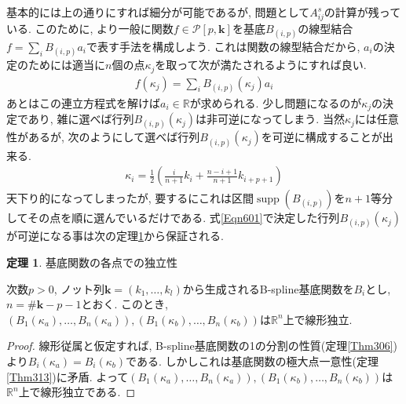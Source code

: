 \documentclass{jsarticle}
\newcommand\setR{\mathbb{R}}
\newcommand\Pare[1]{\left(#1\right)}
\DeclareMathOperator{\supp}{supp}
\theoremstyle{definition}%
\newtheorem{thm}{定理}
\begin{document}
基本的には上の通りにすれば細分が可能であるが, 問題として$A^s_{ij}$の計算が残っている.
このために, より一般に関数$f\in \mathcal{P}[p,\bm{k}]$を基底$B_{(i,p)}$の線型結合$f=\sum_iB_{(i,p)}a_i$で表す手法を構成しよう.
これは関数の線型結合だから, $a_i$の決定のためには適当に$n$個の点$\kappa_j$を取って次が満たされるようにすれば良い.
\begin{align}
    f(\kappa_j)=\sum_{i}B_{(i,p)}(\kappa_j)a_i
\end{align}
あとはこの連立方程式を解けば$a_i\in\setR$が求められる.
少し問題になるのが$\kappa_j$の決定であり, 雑に選べば行列$B_{(i,p)}(\kappa_j)$は非可逆になってしまう.
当然$\kappa_j$には任意性があるが, 次のようにして選べば行列$B_{(i,p)}(\kappa_j)$を可逆に構成することが出来る.
\begin{align}
    \label{Eqn601}
    \kappa_i=\frac{1}{2}\Pare{\frac{i}{n+1}k_i+\frac{n-i+1}{n+1}k_{i+p+1}}
\end{align}
天下り的になってしまったが, 要するにこれは区間$\supp(B_{(i,p)})$を$n+1$等分してその点を順に選んでいるだけである.
式\eqref{Eqn601}で決定した行列$B_{(i,p)}(\kappa_j)$が可逆になる事は次の定理\ref{Thm601}から保証される.
\begin{screen}
	\begin{thm}
        \label{Thm601}
		基底関数の各点での独立性

        次数$p>0$, ノット列$\bm{k}=(k_1,\dots,k_l)$から生成されるB-spline基底関数を$B_i$とし, $n=\# \bm{k}-p-1$とおく.
        このとき, $\Pare{B_1(\kappa_a),\dots,B_n(\kappa_a)}, \Pare{B_1(\kappa_b),\dots,B_n(\kappa_b)}$は$\setR^n$上で線形独立.
	\end{thm}
\end{screen}
\begin{proof}
    線形従属と仮定すれば, B-spline基底関数の1の分割の性質(定理\ref{Thm306})より$B_i(\kappa_a)=B_i(\kappa_b)$である.
    しかしこれは基底関数の極大点一意性(定理\ref{Thm313})に矛盾.
    よって$\Pare{B_1(\kappa_a),\dots,B_n(\kappa_a)}, \Pare{B_1(\kappa_b),\dots,B_n(\kappa_b)}$は$\setR^n$上で線形独立である.
\end{proof}
\end{document}
